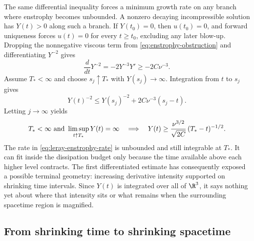 The same differential inequality forces a minimum growth rate on any branch
where enstrophy becomes unbounded.  A nonzero decaying incompressible solution
has \(Y(t)>0\) along such a branch.  If \(Y(t_0)=0\), then \(u(t_0)=0\), and
forward uniqueness forces \(u(t)=0\) for every \(t\ge t_0\), excluding any
later blow-up.  Dropping the nonnegative viscous term from
\eqref{eq:enstrophy-obstruction} and differentiating \(Y^{-2}\) gives
\[
 \frac d{dt}Y^{-2}
 =-2Y^{-3}Y'
 \ge -2C\nu^{-3}.
\]
Assume \(T_*<\infty\) and choose \(s_j\uparrow T_*\) with
\(Y(s_j)\to\infty\).  Integration from \(t\) to \(s_j\) gives
\[
 Y(t)^{-2}
 \le Y(s_j)^{-2}+2C\nu^{-3}(s_j-t).
\]
Letting \(j\to\infty\) yields
\begin{equation}
 T_*<\infty\ \hbox{and}\
 \limsup_{t\uparrow T_*}Y(t)=\infty
 \quad\Longrightarrow\quad
 Y(t)\ge
 \frac{\nu^{3/2}}{\sqrt{2C}}\,(T_*-t)^{-1/2}.
 \label{eq:leray-enstrophy-rate}
\end{equation}
The rate in \eqref{eq:leray-enstrophy-rate} is unbounded and still integrable
at \(T_*\).  It can fit inside the dissipation budget only because the time
available above each higher level contracts.  The first differentiated
estimate has consequently exposed a possible terminal geometry: increasing
derivative intensity supported on shrinking time intervals.  Since \(Y(t)\)
is integrated over all of \(\R^3\), it says nothing yet about where that
intensity sits or what remains when the surrounding spacetime region is
magnified.

\subsection{From shrinking time to shrinking spacetime}
\label{sec:CKN}

